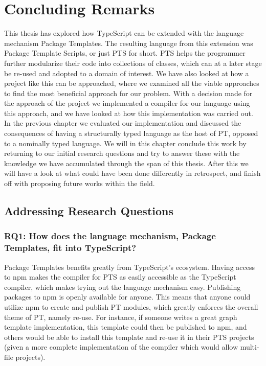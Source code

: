 \chapter{Concluding Remarks}\label{ch:results}

This thesis has explored how TypeScript can be extended with the language mechanism Package Templates.
The resulting language from this extension was Package Template Scripts, or just PTS for short.
PTS helps the programmer further modularize their code into collections of classes, which can at a later stage be re-used and adopted to a domain of interest.
We have also looked at how a project like this can be approached, where we examined all the viable approaches to find the most beneficial approach for our problem.
With a decision made for the approach of the project we implemented a compiler for our language using this approach, and we have looked at how this implementation was carried out.
In the previous chapter we evaluated our implementation and discussed the consequences of having a structurally typed language as the host of PT, opposed to a nominally typed language.
We will in this chapter conclude this work by returning to our initial research questions and try to answer these with the knowledge we have accumulated through the span of this thesis.
After this we will have a look at what could have been done differently in retrospect, and finish off with proposing future works within the field.


\section{Addressing Research Questions}\label{sec:adressing-research-questions}


\subsection*{RQ1: How does the language mechanism, Package Templates, fit into TypeScript?}

Package Templates benefits greatly from TypeScript's ecosystem.
Having access to npm makes the compiler for PTS as easily accessible as the TypeScript compiler, which makes trying out the language mechanism easy.
Publishing packages to npm is openly available for anyone.
This means that anyone could utilize npm to create and publish PT modules, which greatly enforces the overall theme of PT, namely re-use.
For instance, if someone writes a great graph template implementation, this template could then be published to npm, and others would be able to install this template and re-use it in their PTS projects (given a more complete implementation of the compiler which would allow multi-file projects).

